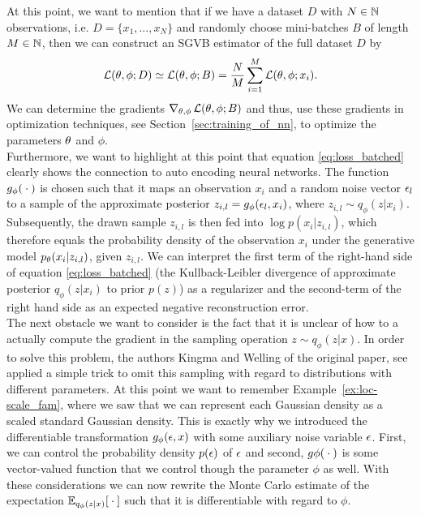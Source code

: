 At this point, we want to mention that if we have a dataset $D$ with $N\in\operatorname{\mathbb{N}}$ observations, i.e. $D=\{x_1,\ldots, x_N\}$ and randomly choose mini-batches $B$ of length $M\in\operatorname{\mathbb{N}}$, then we can construct an SGVB estimator of the full dataset $D$ by
\begin{align*}
\operatorname{\mathcal{L}}(\theta, \phi; D) \simeq \operatorname{\mathcal{L}}(\theta, \phi; B) = \frac{N}{M} \sum_{i=1}^M\operatorname{\mathcal{L}}(\theta, \phi; x_i).
\end{align*}
We can determine the gradients $\nabla_{\theta,\phi}\operatorname{\mathcal{L}}(\theta, \phi; B)$ and thus, use these gradients in optimization techniques, see Section~\ref{sec:training_of_nn}, to optimize the parameters $\theta$ and $\phi$.\\
Furthermore, we want to highlight at this point that equation \eqref{eq:loss_batched} clearly shows the connection to auto encoding neural networks. The function $g_{\phi}({}\cdot{})$ is chosen such that it maps an observation $x_i$ and a random noise vector $\operatorname{\epsilon}_l$ to a sample of the approximate posterior $z_{i,l} = g_{\phi}(\operatorname{\epsilon}_l, x_i)$, where $z_{i,l}\sim q_{\phi}(z|x_i)$. Subsequently, the drawn sample $z_{i,l}$ is then fed into $\log p(x_i|z_{i,l})$, which therefore equals the probability density of the observation $x_i$ under the generative model $p_{\theta}(x_i|z_{i,l})$, given $z_{i,l}$. We can interpret the first term of the right-hand side of equation \eqref{eq:loss_batched} (the Kullback-Leibler divergence of approximate posterior $q_{\phi}(z|x_i)$ to prior $p(z)$) as a regularizer and the second-term of the right hand side as an expected negative reconstruction error.\\
The next obstacle we want to consider is the fact that it is unclear of how to a actually compute the gradient in the sampling operation $z\sim q_{\phi}(z|x)$. In order to solve this problem, the authors Kingma and Welling of the original paper, see \cite{kingma2013auto} applied a simple trick to omit this sampling with regard to distributions with different parameters. At this point we want to remember Example~\ref{ex:loc-scale_fam}, where we saw that we can represent each Gaussian density as a scaled standard Gaussian density. This is exactly why we introduced the differentiable transformation $g_{\phi}(\operatorname{\epsilon}, x)$ with some auxiliary noise variable $\operatorname{\epsilon}$. First, we can control the probability density $p(\operatorname{\epsilon})$ of $\operatorname{\epsilon}$ and second, $g\phi({}\cdot{})$ is some vector-valued function that we control though the parameter $\phi$ as well. With these considerations we can now rewrite the Monte Carlo estimate of the expectation $\operatorname{\mathbb{E}}_{q_{\phi}(z|x)}[{}\cdot{}]$ such that it is differentiable with regard to $\phi$.
